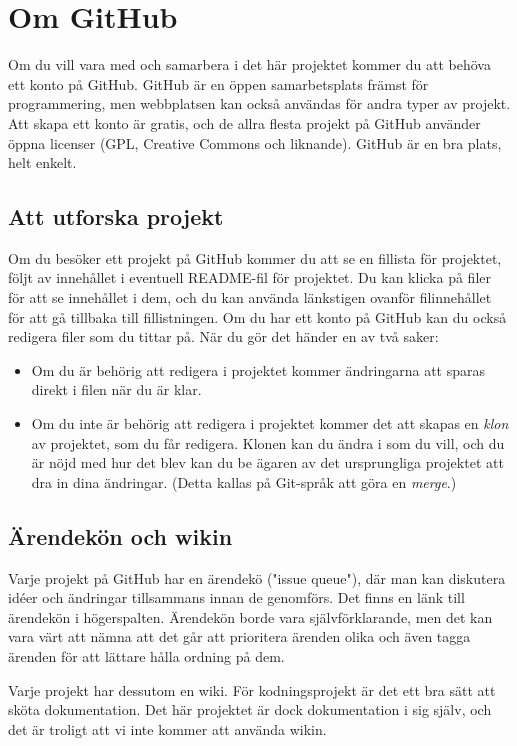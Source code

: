 \section{Om GitHub}

Om du vill vara med och samarbera i det här projektet kommer du att behöva ett konto på GitHub.
GitHub är en öppen samarbetsplats främst för programmering, men webbplatsen kan också användas för andra typer av projekt.
Att skapa ett konto är gratis, och de allra flesta projekt på GitHub använder öppna licenser (GPL, Creative Commons och liknande).
GitHub är en bra plats, helt enkelt.


\subsection{Att utforska projekt}

Om du besöker ett projekt på GitHub kommer du att se en fillista för projektet, följt av innehållet i eventuell README-fil för projektet.
Du kan klicka på filer för att se innehållet i dem, och du kan använda länkstigen ovanför filinnehållet för att gå tillbaka till fillistningen.
Om du har ett konto på GitHub kan du också redigera filer som du tittar på.
När du gör det händer en av två saker:

\begin{itemize}

\item Om du är behörig att redigera i projektet kommer ändringarna att sparas direkt i filen när du är klar.
\item Om du inte är behörig att redigera i projektet kommer det att skapas en \emph{klon} av projektet, som du får redigera.
Klonen kan du ändra i som du vill, och du är nöjd med hur det blev kan du be ägaren av det ursprungliga projektet att dra in dina ändringar.
(Detta kallas på Git-språk att göra en \emph{merge}.)

\end{itemize}


\subsection{Ärendekön och wikin}

Varje projekt på GitHub har en ärendekö ("issue queue"), där man kan diskutera idéer och ändringar tillsammans innan de genomförs.
Det finns en länk till ärendekön i högerspalten.
Ärendekön borde vara självförklarande, men det kan vara värt att nämna att det går att prioritera ärenden olika och även tagga ärenden för att lättare hålla ordning på dem.

Varje projekt har dessutom en wiki. För kodningsprojekt är det ett bra sätt att sköta dokumentation.
Det här projektet är dock dokumentation i sig själv, och det är troligt att vi inte kommer att använda wikin.
